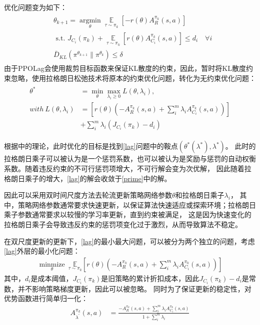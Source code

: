优化问题变为如下：
\begin{align}
\begin{split}
    &\theta_{k+1} = \mathop{\arg\min}\limits_{\theta} \underset{\substack{\tau \sim \pi_{k}}}{\mathbb{E}}\left[-r(\theta) A_{R}^{\pi_{k}}(s, a)\right] \\
    &\text { s.t. } J_{C_{i}}(\pi_{k})+\underset{\substack{\tau \sim \pi_{k}}}{\mathbb{E}}\left[r(\theta) A_{C_{i}}^{\pi_{k}}(s, a)\right] \leq d_{i} \quad \forall i \\
    &\bar{D}_{K L}\left(\pi^{\theta_{k+1}} \| \pi^{\theta_{k}}\right) \leq \delta 
    \label{prime}
\end{split}
\end{align}
由于PPOLag会使用裁剪目标函数来保证KL散度的约束，因此，暂时将KL散度约束忽略，使用拉格朗日松弛技术将原本的约束优化问题，转化为无约束优化问题：
\begin{align}
\begin{split}
    \theta^{*}&=\min _{\theta} \max _{\lambda_{i} \geq 0} L(\theta, \lambda_{i}),\\
        \textit{} {with}\ L(\theta,\lambda_{i}) & = \left [r(\theta)(-A_{R}^{\pi_{k}}(s, a)+ \sum_{i}^{m} \lambda_{i}A_{C_{i}}^{\pi_{k}}(s, a))\right ]\\
        &+ \sum_{i}^{m} \lambda_{i}(J_{C_{i}}(\pi_{k})-d_{i})
\end{split}
\label{lag}
\end{align}

根据\cite{tessler2018reward}中的理论，此时优化的目标是找到\autoref{lag}问题中的鞍点$(\theta^{*}(\lambda^{*}),\lambda^{*})$。
此时的拉格朗日乘子可以被认为是一个惩罚系数，也可以被认为是奖励与惩罚的自动权衡系数。随着违反约束的不可行惩罚项增大，不可行解会变为次优解，
因此随着拉格朗日乘子的增大，\autoref{lag}的解会收敛于\autoref{prime}中的解。

因此可以采用双时间尺度方法去轮流更新策略网络参数$\theta$和拉格朗日乘子$\lambda_{i}$，
其中，策略网络参数通常要求快速更新，以保证算法快速适应或探索环境；拉格朗日乘子参数通常要求以较慢的学习率更新，直到约束被满足，
这是因为快速变化的拉格朗日乘子会导致违反约束的惩罚项变化过于激烈，从而导致算法不稳定。

在双尺度更新的更新下，\autoref{lag}的最小最大问题，可以被分为两个独立的问题，考虑\autoref{lag}外层的最小化问题：
\begin{align}
    \underset{\theta}{\operatorname{minmize}} \ \underset{\tau \sim \pi_{k}}{\mathbb{E}}\left[r(\theta)(-A_{R}^{\pi_{k}}(s, a)+ \sum_{i}^{m} \lambda_{i}A_{C_{i}}^{\pi_{k}}(s, a))\right]
\end{align}
其中，$d_{i}$是成本阈值，$J_{C_{i}}(\pi_{k})$是旧策略的累计折扣成本，因此$J_{C_{i}}(\pi_{k})-d_{i}$是常数，并不影响策略梯度更新，因此可以被忽略。
同时为了保证更新的稳定性，对优势函数进行简单归一化：
\begin{align} 
    {A}_{\lambda^{\prime}}^{\pi_{k}}(s, a)&=\frac{-A_{R}^{\pi_{k}}(s, a)+ \sum_{i}^{m} \lambda_{i}A_{C_{i}}^{\pi_{k}}(s, a)}{1+\sum_{i}^{m} \lambda_{i}} 
\end{align}


